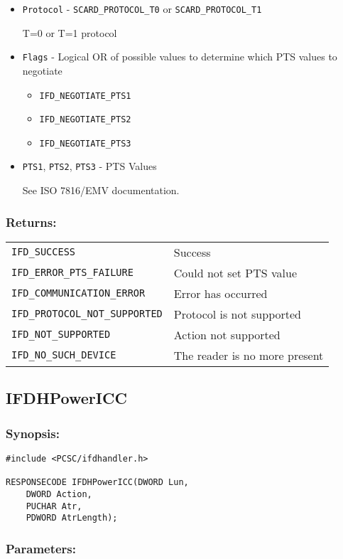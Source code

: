 \documentclass[a4paper,12pt]{article}
\newcommand{\synopsis}{\subsubsection{Synopsis:}}
\newcommand{\parameters}{\subsubsection{Parameters:}}
\newcommand{\returns}{\subsubsection{Returns:}}
\begin{document}
\begin{itemize}
\item \texttt{Protocol} - \texttt{SCARD\_PROTOCOL\_T0} or
\texttt{SCARD\_PROTOCOL\_T1}

T=0 or T=1 protocol

\item \texttt{Flags} - Logical OR of possible values to determine which PTS
values to negotiate

\begin{itemize}
\item \texttt{IFD\_NEGOTIATE\_PTS1}
\item \texttt{IFD\_NEGOTIATE\_PTS2}
\item \texttt{IFD\_NEGOTIATE\_PTS3}
\end{itemize}

\item \texttt{PTS1}, \texttt{PTS2}, \texttt{PTS3} - PTS Values

See ISO 7816/EMV documentation.

\end{itemize}

\returns

\begin{tabular}{ll}
\texttt{IFD\_SUCCESS} & Success\\
\texttt{IFD\_ERROR\_PTS\_FAILURE} & Could not set PTS value\\
\texttt{IFD\_COMMUNICATION\_ERROR} & Error has occurred\\
\texttt{IFD\_PROTOCOL\_NOT\_SUPPORTED} & Protocol is not supported\\
\texttt{IFD\_NOT\_SUPPORTED} & Action not supported\\
\texttt{IFD\_NO\_SUCH\_DEVICE} & The reader is no more present\\
\end{tabular}


\subsection{IFDHPowerICC}

\synopsis
\begin{verbatim}
#include <PCSC/ifdhandler.h>

RESPONSECODE IFDHPowerICC(DWORD Lun,
    DWORD Action,
    PUCHAR Atr,
    PDWORD AtrLength);
\end{verbatim}

\parameters
\end{document}

